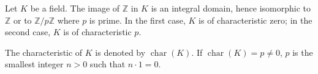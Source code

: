 Let $K$ be a field. The image of $\mathbb{Z}$ in $K$ is an integral domain, hence isomorphic to $\mathbb{Z}$ or to $\mathbb{Z}/p\mathbb{Z}$ where $p$ is prime. In the first case, $K$ is of characteristic zero; in the second case, $K$ is of characteristic $p$.

The characteristic of $K$ is denoted by $\operatorname{char}(K)$. If $\operatorname{char}(K) = p \neq 0$, $p$ is the smallest integer $n > 0$ such that $n \cdot 1 = 0$.

